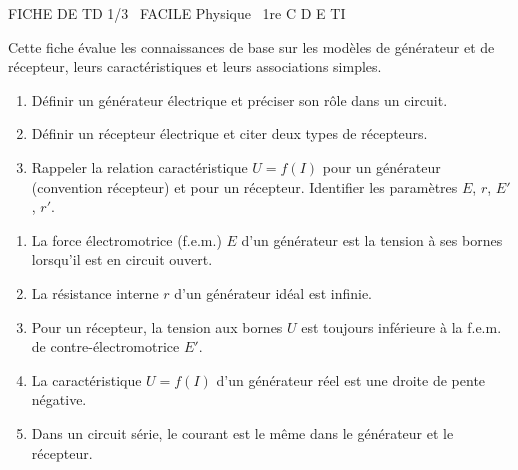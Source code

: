 \documentclass[11pt]{article}
\begin{document}
\begin{tcolorbox}[enhanced,colback=popink,colframe=popink,arc=10pt,boxrule=0pt,left=12pt,right=12pt,top=9pt,bottom=9pt]
{\color{white}\popxbold\small FICHE DE TD 1/3 \textbullet\ FACILE \hfill Physique \textbullet\ 1re C D E TI\par}
\end{tcolorbox}
\vspace{4pt}
Cette fiche évalue les connaissances de base sur les modèles de générateur et de récepteur, leurs caractéristiques et leurs associations simples.

\begin{exercice}
\begin{enumerate}
    \item Définir un générateur électrique et préciser son rôle dans un circuit.
    \item Définir un récepteur électrique et citer deux types de récepteurs.
    \item Rappeler la relation caractéristique $U = f(I)$ pour un générateur (convention récepteur) et pour un récepteur. Identifier les paramètres $E$, $r$, $E'$, $r'$.
\end{enumerate}
\end{exercice}

\begin{exercice}
\begin{enumerate}
    \item La force électromotrice (f.e.m.) $E$ d'un générateur est la tension à ses bornes lorsqu'il est en circuit ouvert.
    \item La résistance interne $r$ d'un générateur idéal est infinie.
    \item Pour un récepteur, la tension aux bornes $U$ est toujours inférieure à la f.e.m. de contre-électromotrice $E'$.
    \item La caractéristique $U = f(I)$ d'un générateur réel est une droite de pente négative.
    \item Dans un circuit série, le courant est le même dans le générateur et le récepteur.
\end{enumerate}
\end{exercice}
\end{document}
